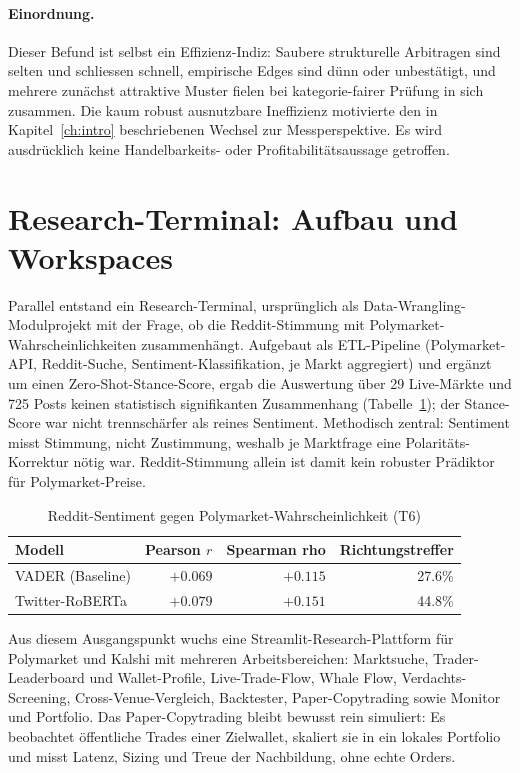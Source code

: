 \paragraph{Einordnung.}
Dieser Befund ist selbst ein Effizienz-Indiz: Saubere strukturelle Arbitragen sind
selten und schliessen schnell, empirische Edges sind dünn oder unbestätigt, und
mehrere zunächst attraktive Muster fielen bei kategorie-fairer Prüfung in sich
zusammen. Die kaum robust ausnutzbare Ineffizienz motivierte den in
Kapitel~\ref{ch:intro} beschriebenen Wechsel zur Messperspektive. Es wird
ausdrücklich keine Handelbarkeits- oder Profitabilitätsaussage getroffen.

\section{Research-Terminal: Aufbau und Workspaces}
\label{sec:loesung-terminal}
Parallel entstand ein Research-Terminal, ursprünglich als Data-Wrangling-Modulprojekt
mit der Frage, ob die Reddit-Stimmung mit Polymarket-Wahrscheinlichkeiten
zusammenhängt. Aufgebaut als ETL-Pipeline (Polymarket-API, Reddit-Suche,
Sentiment-Klassifikation, je Markt aggregiert) und ergänzt um einen
Zero-Shot-Stance-Score, ergab die Auswertung über 29 Live-Märkte und 725 Posts
keinen statistisch signifikanten Zusammenhang (Tabelle~\ref{tab:t6}); der
Stance-Score war nicht trennschärfer als reines Sentiment. Methodisch zentral:
Sentiment misst Stimmung, nicht Zustimmung, weshalb je Marktfrage eine
Polaritäts-Korrektur nötig war. Reddit-Stimmung allein ist damit kein robuster
Prädiktor für Polymarket-Preise.

\begin{table}[ht]
\centering
\caption{Reddit-Sentiment gegen Polymarket-Wahrscheinlichkeit (T6)}
\label{tab:t6}
\small
\begin{tabular}{@{}lrrr@{}}
\toprule
Modell & Pearson $r$ & Spearman rho & Richtungstreffer \\
\midrule
VADER (Baseline) & $+0.069$ & $+0.115$ & 27.6\% \\
Twitter-RoBERTa & $+0.079$ & $+0.151$ & 44.8\% \\
\bottomrule
\end{tabular}
\end{table}

Aus diesem Ausgangspunkt wuchs eine Streamlit-Research-Plattform für Polymarket und
Kalshi mit mehreren Arbeitsbereichen: Marktsuche, Trader-Leaderboard und
Wallet-Profile, Live-Trade-Flow, Whale Flow, Verdachts-Screening,
Cross-Venue-Vergleich, Backtester, Paper-Copytrading sowie Monitor und Portfolio.
Das Paper-Copytrading bleibt bewusst rein simuliert: Es beobachtet öffentliche
Trades einer Zielwallet, skaliert sie in ein lokales Portfolio und misst Latenz,
Sizing und Treue der Nachbildung, ohne echte Orders.

